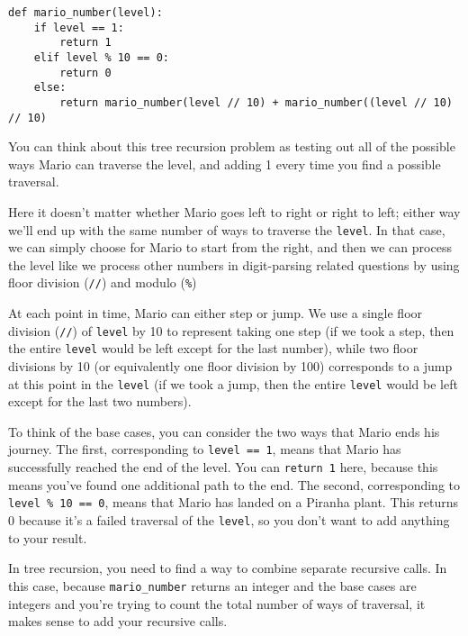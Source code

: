 \begin{solution}
\begin{blocksection}
\begin{lstlisting}
def mario_number(level):
    if level == 1:
        return 1
    elif level % 10 == 0:
        return 0
    else:
        return mario_number(level // 10) + mario_number((level // 10) // 10)
\end{lstlisting}
You can think about this tree recursion problem as testing out all of the possible ways Mario can traverse the level, and adding 1 every time you find a possible traversal.

Here it doesn't matter whether Mario goes left to right or right to left; either way we'll end up with the same number of ways to traverse the \lstinline{level}. In that case, we can simply choose for Mario to start from the right, and then we can process the level like we process other numbers in digit-parsing related questions by using floor division (\lstinline{//}) and modulo (\lstinline{%})

At each point in time, Mario can either step or jump. We use a single floor division (\lstinline{//}) of \lstinline{level} by 10 to represent taking one step (if we took a step, then the entire \lstinline{level} would be left except for the last number), while two floor divisions by 10 (or equivalently one floor division by 100) corresponds to a jump at this point in the \lstinline{level} (if we took a jump, then the entire \lstinline{level} would be left except for the last two numbers).

To think of the base cases, you can consider the two ways that Mario ends his journey. The first, corresponding to \lstinline{level == 1}, means that Mario has successfully reached the end of the level. You can \lstinline{return 1} here, because this means you've found one additional path to the end. The second, corresponding to \lstinline{level % 10 == 0}, means that Mario has landed on a Piranha plant. This returns 0 because it's a failed traversal of the \lstinline{level}, so you don't want to add anything to your result.

In tree recursion, you need to find a way to combine separate recursive calls. In this case, because \lstinline{mario_number} returns an integer and the base cases are integers and you're trying to count the total number of ways of traversal, it makes sense to add your recursive calls.

\end{blocksection}
\end{solution}


